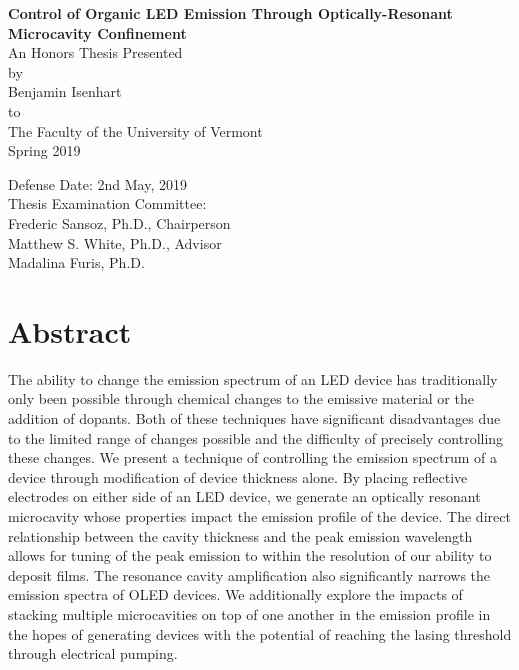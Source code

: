 \documentclass{report}
\author{Benjamin Isenhart}
\begin{document}
\begin{titlepage}
	\begin{center}
		\vspace{1cm}
		\Huge
		\textbf{Control of Organic LED Emission Through Optically-Resonant Microcavity Confinement}\\
		\vspace{1.5cm}
		\Large
		An Honors Thesis Presented\\
		by\\
		Benjamin Isenhart\\
		to\\
		The Faculty of the University of Vermont\\
		\vspace{0.5cm}
		Spring 2019
		\vspace{2cm}
	\end{center}
	\begin{flushright}
		\Large
		Defense Date: 2nd May, 2019\\
		Thesis Examination Committee:\\
		\vspace{0.5cm}
		Frederic Sansoz, Ph.D., Chairperson\\
		Matthew S. White, Ph.D., Advisor\\
		Madalina Furis, Ph.D.\\
	\end{flushright}
\end{titlepage}

\chapter*{Abstract} \label{abstract}
The ability to change the emission spectrum of an LED device has traditionally only been possible through chemical changes to the emissive material or the addition of dopants. Both of these techniques have significant disadvantages due to the limited range of changes possible and the difficulty of precisely controlling these changes. We present a technique of controlling the emission spectrum of a device through modification of device thickness alone. By placing reflective electrodes on either side of an LED device, we generate an optically resonant microcavity whose properties impact the emission profile of the device. The direct relationship between the cavity thickness and the peak emission wavelength allows for tuning of the peak emission to within the resolution of our ability to deposit films. The resonance cavity amplification also significantly narrows the emission spectra of OLED devices. We additionally explore the impacts of stacking multiple microcavities on top of one another in the emission profile in the hopes of generating devices with the potential of reaching the lasing threshold through electrical pumping.
\end{document}
